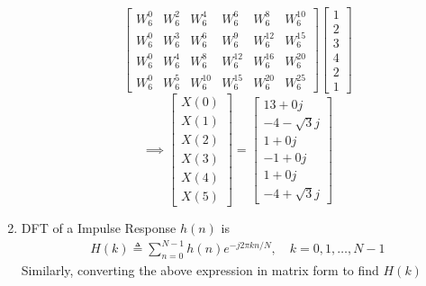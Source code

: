 \documentclass[journal,12pt,twocolumn]{IEEEtran}
\renewcommand\thesection{\arabic{section}}
\begin{document}
\begin{enumerate}[label=\thesection.\arabic*.,ref=\thesection.\theenumi]
\begin{equation}
\begin{bmatrix}
W^{0}_{6} & W^{2}_{6} & W^{4}_{6} & W^{6}_{6} & W^{8}_{6} & W^{10}_{6}\\
W^{0}_{6} & W^{3}_{6} & W^{6}_{6} & W^{9}_{6} & W^{12}_{6} & W^{15}_{6}\\
W^{0}_{6} & W^{4}_{6} & W^{8}_{6} & W^{12}_{6} & W^{16}_{6} & W^{20}_{6}\\
W^{0}_{6} & W^{5}_{6} & W^{10}_{6} & W^{15}_{6} & W^{20}_{6} & W^{25}_{6} 
\end{bmatrix}
\begin{bmatrix}
1 \\ 2 \\ 3 \\ 4 \\ 2 \\ 1
\end{bmatrix}
\end{equation}
\begin{equation}
\implies
\begin{bmatrix} 
X(0) \\ 
X(1) \\ 
X(2) \\ 
X(3) \\ 
X(4) \\ 
X(5) 
\end{bmatrix}
=
\begin{bmatrix}
13+0j \\ 
-4-\sqrt{3}j\\ 
1+0j \\ 
-1+0j\\ 
1+0j \\ 
-4+\sqrt{3}j
\end{bmatrix}
\end{equation}

\item

DFT of a Impulse Response $h(n)$ is 
\begin{align}
H(k) \triangleq \sum_{n=0}^{N-1} h(n) e^{-j 2 \pi k n / N}, \quad k=0,1, \ldots, N-1
\end{align}
Similarly, converting the above expression in matrix form to find $H(k)$


\end{enumerate}
\end{document}
